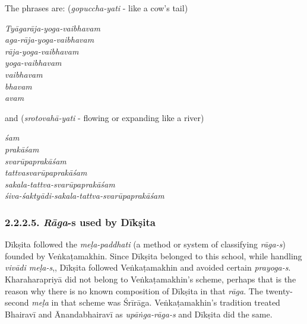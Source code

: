 The phrases are: (\textit{gopuccha-yati} - like a cow’s tail)

\begin{myquote}
\textit{Tyāgarāja-yoga-vaibhavam}\\ \textit{aga-rāja-yoga-vaibhavam}\\ \textit{rāja-yoga-vaibhavam}\\ \textit{yoga-vaibhavam}\\ \textit{vaibhavam}\\ \textit{bhavam}\\ \textit{avam}
\end{myquote}

and (\textit{srotovahā-yati} - flowing or expanding like a river)

\begin{myquote}
\textit{śam}\\ \textit{prakāśam}\\ \textit{svarūpaprakāśam}\\ \textit{tattvasvarūpaprakāśam}\\ \textit{sakala-tattva-svarūpaprakāśam}\\ \textit{śiva-śaktyādi-sakala-tattva-svarūpaprakāśam}
\end{myquote}

\vspace{-.4cm}

\subsubsection*{2.2.2.5. \textit{Rāga}-s used by Dīkṣita}

\vspace{-.2cm}

Dīkṣita followed the \textit{meḷa-paddhati} (a method or system of classifying \textit{rāga-s}) founded by Veṅkaṭamakhin. Since Dīkṣita belonged to this school, while handling \textit{vivādi meḷa-s},, Dīkṣita followed Veṅkaṭamakhin and avoided certain \textit{prayoga-s}. Kharaharapriyā did not belong to Veṅkaṭamakhin’s scheme, perhaps that is the reason why there is no known composition of Dīkṣita in that \textit{rāga}. The twenty-second \textit{meḷa} in that scheme was Śrīrāga. Veṅkaṭamakhin’s tradition treated Bhairavī and Ānandabhairavī as \textit{upāṅga-rāga-s} and Dīkṣita did the same.

